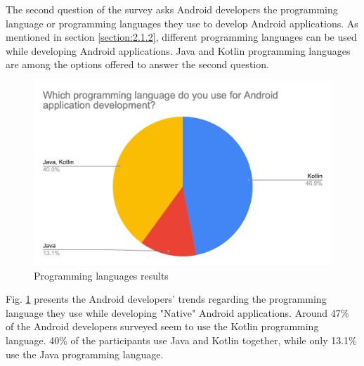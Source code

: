 The second question of the survey asks Android developers the programming language or programming languages they use to develop Android applications. As mentioned in section \ref{section:2.1.2}, different programming languages can be used while developing Android applications. Java and Kotlin programming languages are among the options offered to answer the second question.
\begin{figure}[ht!]
    \centering
    \includegraphics[scale=0.3]{figures/survey_q2_programming_language.png}
    \caption{Programming languages results}
    \label{fig:programming_languages}
\end{figure}

Fig. \ref{fig:programming_languages} presents the Android developers' trends regarding the programming language they use while developing "Native" Android applications. Around 47\% of the Android developers surveyed seem to use the Kotlin programming language. 40\% of the participants use Java and Kotlin together, while only 13.1\% use the Java programming language.